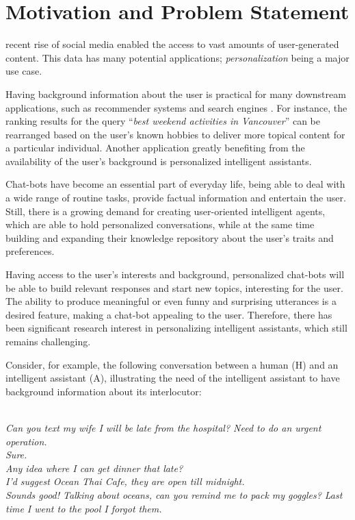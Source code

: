 \section{Motivation and Problem Statement}
\label{mot}

 recent rise of social media enabled the access to vast amounts of user-generated content. This data has many potential applications; \textit{personalization} being a major use case.

Having background information about the user is practical for many downstream applications, such as recommender systems and search engines \cite{balog2019personal}. 
For instance, the ranking results for the query ``\textit{best weekend activities in Vancouver}'' can be rearranged based on the user's known hobbies to deliver more topical content for a particular individual. Another application greatly benefiting from the availability of the user's background is personalized intelligent assistants.

Chat-bots have become an essential part of everyday life, being able to deal with a wide range of routine tasks, provide factual information and entertain the user. Still, there is a growing demand for creating user-oriented intelligent agents, which are able to hold personalized conversations, while at the same time building and expanding their knowledge repository about the user's traits and preferences. 

Having access to the user's interests and background, personalized chat-bots will be able to build relevant responses and start new topics, interesting for the user. The ability to produce meaningful or even funny and surprising utterances is a desired feature, making a chat-bot appealing to the user. Therefore, there has been significant research interest in personalizing intelligent assistants, which still remains challenging. 

Consider, for example, the following conversation between a human (H) and an intelligent assistant (A), illustrating the need of the intelligent assistant to have background information about its interlocutor:
\begin{samepage}
\vspace{0.3cm} \\ \nopagebreak
\hspace*{0.3cm}{H:} {\em Can you text my wife I will be late from the hospital? Need to do an urgent operation.}\\\nopagebreak
\hspace*{0.3cm}{A:} {\em Sure.}\\\nopagebreak
\hspace*{0.3cm}{H:} {\em Any idea where I can get dinner that late?}\\\nopagebreak
\hspace*{0.3cm}{A:} {\em I'd suggest Ocean Thai Cafe, they are open till midnight.}\\\nopagebreak
\hspace*{0.3cm}{H:} {\em Sounds good! Talking about oceans, can you remind me to pack my goggles? Last time I went to the pool I forgot them.}
\vspace{0.3cm}
\end{samepage}


